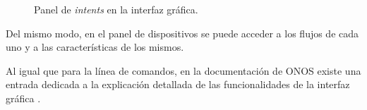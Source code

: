 \begin{figure}[th]
	\centering 
	\caption[Panel de \textit{intents} en la interfaz gráfica]{Panel de \textit{intents} en la interfaz gráfica.}
	\label{fig:guiintent}
\end{figure}

Del mismo modo, en el panel de dispositivos se puede acceder a los flujos de cada uno y a las características de los mismos. 

Al igual que para la línea de comandos, en la documentación de ONOS existe una entrada dedicada a la explicación detallada de las funcionalidades de la interfaz gráfica \parencite{onosgui}.
